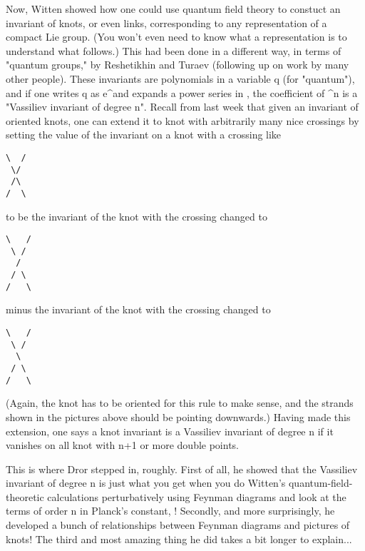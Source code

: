 Now, Witten showed how one could use quantum field theory to constuct an
invariant of knots, or even links, corresponding to any representation
of a compact Lie group.  (You won't even need to know what a
representation is to understand what follows.)  This had been done in a
different way, in terms of "quantum groups," by Reshetikhin and Turaev
(following up on work by many other people).  These invariants are
polynomials in a variable q (for "quantum"), and if one writes q as
e^\hbar  and expands a power series in \hbar , the coefficient of \hbar ^n is
a "Vassiliev invariant of degree n".  Recall from last week that
given an invariant of oriented knots, one can extend
it to knot with arbitrarily many nice crossings by setting
the value of the invariant on a knot with a crossing like

\begin{verbatim}
\  /
 \/
 /\
/  \
\end{verbatim}
    

to be the invariant of the knot with the crossing changed to

\begin{verbatim}
\   /
 \ /
  /
 / \
/   \
\end{verbatim}
    
minus the invariant of the knot with the crossing changed to

\begin{verbatim}
\   /
 \ /
  \
 / \
/   \
\end{verbatim}
    

(Again, the knot has to be oriented for this rule to make sense,
and the strands shown in the pictures above should be pointing
downwards.)   Having made this extension, one says a knot
invariant is a Vassiliev invariant of degree n if it vanishes
on all knot with n+1 or more double points.

This is where Dror stepped in, roughly.  First of all, he showed that
the Vassiliev invariant of degree n is just what you get when you do
Witten's quantum-field-theoretic calculations perturbatively using
Feynman diagrams and look at the terms of order n in Planck's constant,
\hbar !  Secondly, and more surprisingly, he developed a bunch of
relationships between Feynman diagrams and pictures of knots!  The third
and most amazing thing he did takes a bit longer to explain...

